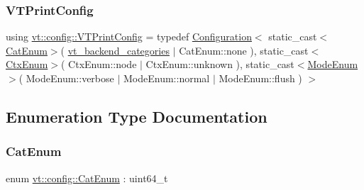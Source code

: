 \subsubsection{\texorpdfstring{V\+T\+Print\+Config}{VTPrintConfig}}
{\footnotesize\ttfamily using \hyperlink{namespacevt_1_1config_aea109b59c3cb20cb90200caf8da049b9}{vt\+::config\+::\+V\+T\+Print\+Config} = typedef \hyperlink{structvt_1_1config_1_1_configuration}{Configuration}$<$ static\+\_\+cast$<$\hyperlink{namespacevt_1_1config_a6bd1d6215bda0d8ca02811798399f689}{Cat\+Enum}$>$( \hyperlink{debug__masterconfig_8h_a997597a3662694b33e86f6c351c760ff}{vt\+\_\+backend\+\_\+categories} $\vert$ Cat\+Enum\+::none ), static\+\_\+cast$<$\hyperlink{namespacevt_1_1config_a46e57c33bee1b9f1fa95455af86d80e0}{Ctx\+Enum}$>$( Ctx\+Enum\+::node $\vert$ Ctx\+Enum\+::unknown ), static\+\_\+cast$<$\hyperlink{namespacevt_1_1config_a724e99568632cc0fe9c456c2230270d0}{Mode\+Enum}$>$( Mode\+Enum\+::verbose $\vert$ Mode\+Enum\+::normal $\vert$ Mode\+Enum\+::flush ) $>$}



\subsection{Enumeration Type Documentation}
\mbox{\label{namespacevt_1_1config_a6bd1d6215bda0d8ca02811798399f689}} 
\subsubsection{\texorpdfstring{Cat\+Enum}{CatEnum}}
{\footnotesize\ttfamily enum \hyperlink{namespacevt_1_1config_a6bd1d6215bda0d8ca02811798399f689}{vt\+::config\+::\+Cat\+Enum} \+: uint64\+\_\+t}

